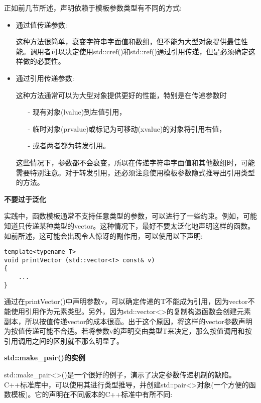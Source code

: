 正如前几节所述，声明依赖于模板参数类型有不同的方式:

\begin{itemize}
\item 
通过值传递参数:

这种方法很简单，衰变字符串字面值和数组，但不能为大型对象提供最佳性能。调用者可以决定使用std::cref()和std::ref()通过引用传递，但是必须确定这样做的必要性。

\item 
通过引用传递参数:

这种方法通常可以为大型对象提供更好的性能，特别是在传递参数时

\begin{itemize}
\item[-]
现有对象(lvalue)到左值引用，

\item[-]
临时对象(prvalue)或标记为可移动(xvalue)的对象将引用右值，

\item[-]
或者两者都为转发引用。
\end{itemize}

这些情况下，参数都不会衰变，所以在传递字符串字面值和其他数组时，可能需要特别注意。对于转发引用，还必须注意使用模板参数隐式推导出引用类型的方法。
\end{itemize}

\noindent
\textbf{不要过于泛化}

实践中，函数模板通常不支持任意类型的参数，可以进行了一些约束。例如，可能知道只传递某种类型的vector。这种情况下，最好不要太泛化地声明这样的函数。如前所述，这可能会出现令人惊讶的副作用，可以使用以下声明:

\begin{lstlisting}[style=styleCXX]
template<typename T>
void printVector (std::vector<T> const& v)
{
	...
}
\end{lstlisting}

通过在printVector()中声明参数v，可以确定传递的T不能成为引用，因为vector不能使用引用作为元素类型。另外，因为std::vector<>的复制构造函数会创建元素副本，所以按值传递vector的成本很高。出于这个原因，将这样的vector参数声明为按值传递可能不合适。若将参数v的声明交由类型T来决定，那么按值调用和按引用调用之间的区别就不那么明显了。

\noindent
\textbf{std::make\_pair()的实例}

std::make\_pair<>()是一个很好的例子，演示了决定参数传递机制的缺陷。C++标准库中，可以使用其进行类型推导，并创建std::pair<>对象(一个方便的函数模板)。它的声明在不同版本的C++标准中有所不同:

